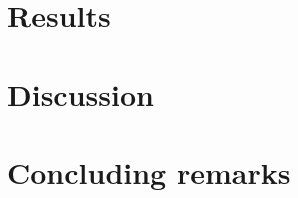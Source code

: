 \documentclass{somasmsc}
\begin{document}
\chapter{Results}\label{results}


\chapter{Discussion}\label{discussion}


\chapter{Concluding remarks}\label{conclusion}






\backmatter
\renewcommand{\bibname}{References}



\end{document}
